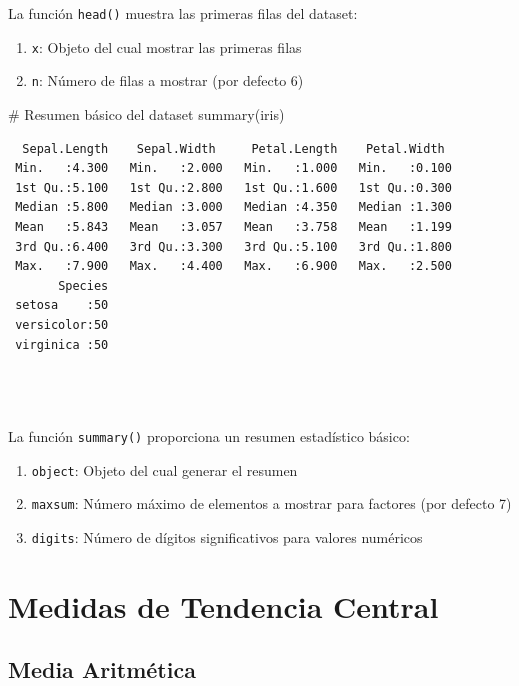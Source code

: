 \documentclass[
  spanish,
  letterpaper,
]{book}
\newenvironment{Shaded}{\begin{snugshade}}{\end{snugshade}}
\newcommand{\CommentTok}[1]{\textcolor[rgb]{0.37,0.37,0.37}{#1}}
\newcommand{\FunctionTok}[1]{\textcolor[rgb]{0.28,0.35,0.67}{#1}}
\newcommand{\NormalTok}[1]{\textcolor[rgb]{0.00,0.23,0.31}{#1}}
\begin{document}
La función \texttt{head()} muestra las primeras filas del dataset:

\begin{enumerate}
\def\labelenumi{\arabic{enumi}.}
\item
  \texttt{x}: Objeto del cual mostrar las primeras filas
\item
  \texttt{n}: Número de filas a mostrar (por defecto 6)
\end{enumerate}

\begin{Shaded}
\begin{Highlighting}[]
\CommentTok{\# Resumen básico del dataset}
\FunctionTok{summary}\NormalTok{(iris)}
\end{Highlighting}
\end{Shaded}

\begin{verbatim}
  Sepal.Length    Sepal.Width     Petal.Length    Petal.Width   
 Min.   :4.300   Min.   :2.000   Min.   :1.000   Min.   :0.100  
 1st Qu.:5.100   1st Qu.:2.800   1st Qu.:1.600   1st Qu.:0.300  
 Median :5.800   Median :3.000   Median :4.350   Median :1.300  
 Mean   :5.843   Mean   :3.057   Mean   :3.758   Mean   :1.199  
 3rd Qu.:6.400   3rd Qu.:3.300   3rd Qu.:5.100   3rd Qu.:1.800  
 Max.   :7.900   Max.   :4.400   Max.   :6.900   Max.   :2.500  
       Species  
 setosa    :50  
 versicolor:50  
 virginica :50  
                
                
                
\end{verbatim}

La función \texttt{summary()} proporciona un resumen estadístico básico:

\begin{enumerate}
\def\labelenumi{\arabic{enumi}.}
\item
  \texttt{object}: Objeto del cual generar el resumen
\item
  \texttt{maxsum}: Número máximo de elementos a mostrar para factores
  (por defecto 7)
\item
  \texttt{digits}: Número de dígitos significativos para valores
  numéricos
\end{enumerate}

\section{Medidas de Tendencia
Central}\label{medidas-de-tendencia-central-1}

\subsection{Media Aritmética}\label{media-aritmuxe9tica-1}
\end{document}
